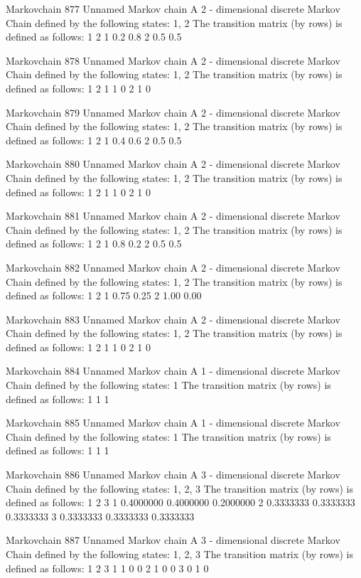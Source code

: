 \documentclass[
  nojss]{jss}
\begin{document}
\begin{CodeChunk}
\begin{CodeOutput}
Markovchain  877 
Unnamed Markov chain 
 A  2 - dimensional discrete Markov Chain defined by the following states: 
 1, 2 
 The transition matrix  (by rows)  is defined as follows: 
    1   2
1 0.2 0.8
2 0.5 0.5

Markovchain  878 
Unnamed Markov chain 
 A  2 - dimensional discrete Markov Chain defined by the following states: 
 1, 2 
 The transition matrix  (by rows)  is defined as follows: 
  1 2
1 1 0
2 1 0

Markovchain  879 
Unnamed Markov chain 
 A  2 - dimensional discrete Markov Chain defined by the following states: 
 1, 2 
 The transition matrix  (by rows)  is defined as follows: 
    1   2
1 0.4 0.6
2 0.5 0.5

Markovchain  880 
Unnamed Markov chain 
 A  2 - dimensional discrete Markov Chain defined by the following states: 
 1, 2 
 The transition matrix  (by rows)  is defined as follows: 
  1 2
1 1 0
2 1 0

Markovchain  881 
Unnamed Markov chain 
 A  2 - dimensional discrete Markov Chain defined by the following states: 
 1, 2 
 The transition matrix  (by rows)  is defined as follows: 
    1   2
1 0.8 0.2
2 0.5 0.5

Markovchain  882 
Unnamed Markov chain 
 A  2 - dimensional discrete Markov Chain defined by the following states: 
 1, 2 
 The transition matrix  (by rows)  is defined as follows: 
     1    2
1 0.75 0.25
2 1.00 0.00

Markovchain  883 
Unnamed Markov chain 
 A  2 - dimensional discrete Markov Chain defined by the following states: 
 1, 2 
 The transition matrix  (by rows)  is defined as follows: 
  1 2
1 1 0
2 1 0

Markovchain  884 
Unnamed Markov chain 
 A  1 - dimensional discrete Markov Chain defined by the following states: 
 1 
 The transition matrix  (by rows)  is defined as follows: 
  1
1 1

Markovchain  885 
Unnamed Markov chain 
 A  1 - dimensional discrete Markov Chain defined by the following states: 
 1 
 The transition matrix  (by rows)  is defined as follows: 
  1
1 1

Markovchain  886 
Unnamed Markov chain 
 A  3 - dimensional discrete Markov Chain defined by the following states: 
 1, 2, 3 
 The transition matrix  (by rows)  is defined as follows: 
          1         2         3
1 0.4000000 0.4000000 0.2000000
2 0.3333333 0.3333333 0.3333333
3 0.3333333 0.3333333 0.3333333

Markovchain  887 
Unnamed Markov chain 
 A  3 - dimensional discrete Markov Chain defined by the following states: 
 1, 2, 3 
 The transition matrix  (by rows)  is defined as follows: 
  1 2 3
1 1 0 0
2 1 0 0
3 0 1 0


\end{CodeOutput}
\end{CodeChunk}
\end{document}
